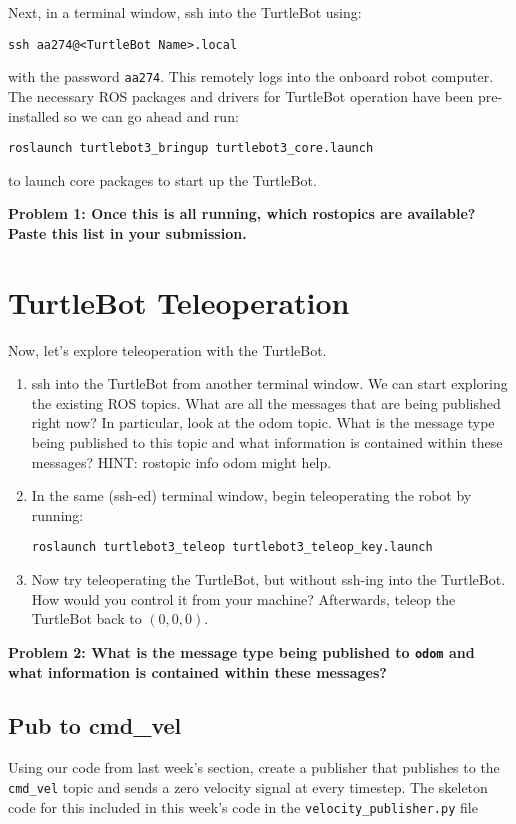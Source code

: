\documentclass{article}
\begin{document}
Next, in a terminal window, ssh into the TurtleBot using:
\begin{lstlisting}
ssh aa274@<TurtleBot Name>.local
\end{lstlisting}

with the password \texttt{aa274}. This remotely logs into the onboard robot computer. The necessary ROS packages
and drivers for TurtleBot operation have been pre-installed so we can go ahead and run:

\begin{lstlisting}
roslaunch turtlebot3_bringup turtlebot3_core.launch	
\end{lstlisting}

to launch core packages to start up the TurtleBot.

{\bf Problem 1: Once this is all running, which rostopics are available? Paste this list in your submission.}

\section{TurtleBot Teleoperation}

Now, let's explore teleoperation with the TurtleBot.

\begin{enumerate}
\item ssh into the TurtleBot from another terminal window. We can start exploring the existing ROS topics. What are all the messages that are being published right now? In particular, look at the odom topic. What is the message type being published to this topic and what information is contained within these messages? HINT: rostopic info odom might help.
\item In the same (ssh-ed) terminal window, begin teleoperating the robot by running:
\begin{lstlisting}
roslaunch turtlebot3_teleop turtlebot3_teleop_key.launch
\end{lstlisting}
\item Now try teleoperating the TurtleBot, but without ssh-ing into the TurtleBot. How would you control it from your machine? Afterwards, teleop the TurtleBot back to $(0,0,0)$.
\end{enumerate}

{\bf Problem 2: What is the message type being published to \texttt{odom} and what information is contained within these messages?}

\subsection{Pub to cmd\_vel}
Using our code from last week's section, create a publisher that publishes to the \texttt{cmd\_vel} topic and sends a zero velocity signal at every timestep. The skeleton code for this included in this week's code in the \texttt{velocity\_publisher.py} file
\end{document}
